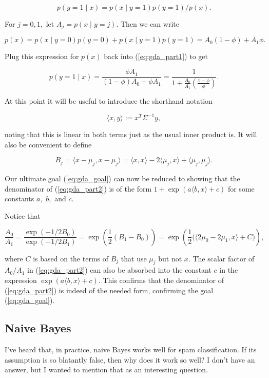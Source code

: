 \documentclass[]{article}
\begin{document}
\begin{equation}p(y=1\mid x) = p(x\mid y=1)p(y=1)/p(x).\label{eq:gda_part1}\end{equation}

For \(j=0,1,\) let \(A_j=p(x\mid y=j).\) Then we can write

\[p(x) = p(x\mid y=0)p(y=0) + p(x\mid y=1)p(y=1) = A_0(1-\phi) + A_1\phi.\]

Plug this expression for \(p(x)\) back into (\ref{eq:gda_part1}) to get

\begin{equation}p(y=1\mid x) = \frac{\phi A_1}{(1-\phi)A_0 + \phi A_1}
= \frac{1}{1 + \frac{A_0}{A_1}\left(\frac{1-\phi}{\phi}\right)}.\label{eq:gda_part2}\end{equation}

At this point it will be useful to introduce the shorthand notation

\[\langle x, y\rangle := x^T\Sigma^{-1}y,\]

noting that this is linear in both terms just as the usual inner product
is. It will also be convenient to define

\[B_j = \langle x-\mu_j, x-\mu_j\rangle
      = \langle x, x\rangle - 2\langle \mu_j,x\rangle + \langle \mu_j, \mu_j
      \rangle.\]

Our ultimate goal (\ref{eq:gda_goal}) can now be reduced to showing that
the denominator of (\ref{eq:gda_part2}) is of the form
\(1 + \exp(a\langle b,x\rangle + c)\) for some constants \(a,\) \(b,\)
and \(c.\)

Notice that

\[\frac{A_0}{A_1} = \frac{\exp(-1/2 B_0)}{\exp(-1/2 B_1)}
   = \exp\left(\frac{1}{2}(B_1-B_0)\right)
   = \exp\left(\frac{1}{2}\big(\langle 2\mu_0 - 2\mu_1, x\rangle+C\big)\right),\]

where \(C\) is based on the terms of \(B_j\) that use \(\mu_j\) but not
\(x.\) The scalar factor of \(A_0/A_1\) in (\ref{eq:gda_part2}) can also
be absorbed into the constant \(c\) in the expression
\(\exp(a\langle b, x\rangle + c).\) This confirms that the denominator
of (\ref{eq:gda_part2}) is indeed of the needed form, confirming the
goal (\ref{eq:gda_goal}).

\subsection{Naive Bayes}\label{naive-bayes}

I've heard that, in practice, naive Bayes works well for spam
classification. If its assumption is so blatantly false, then why does
it work so well? I don't have an answer, but I wanted to mention that as
an interesting question.
\end{document}
